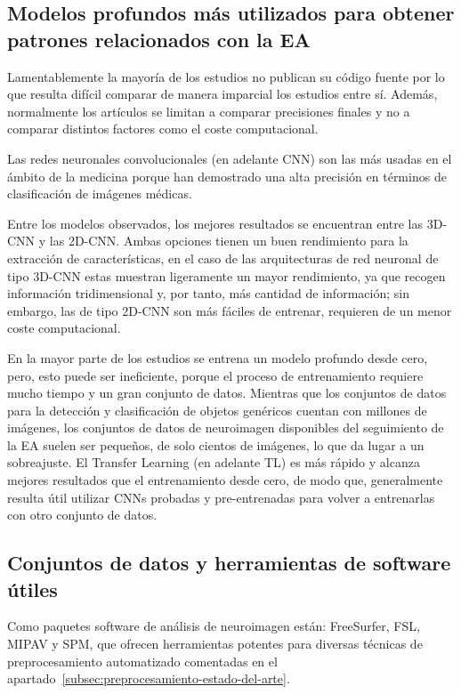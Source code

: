 \subsection{Modelos profundos más utilizados para obtener patrones relacionados con la EA}
\label{subsec:modelos-profundos-estado-del-arte}
Lamentablemente la mayoría de los estudios no publican su código fuente por lo que resulta difícil comparar de manera
imparcial los estudios entre sí.
Además, normalmente los artículos se limitan a comparar precisiones finales y no a comparar distintos factores como el
coste computacional.

Las redes neuronales convolucionales (en adelante CNN) son las más usadas en el ámbito de la medicina porque han
demostrado una alta precisión en términos de clasificación de imágenes médicas.

Entre los modelos observados, los mejores resultados se encuentran entre las 3D-CNN y las 2D-CNN. Ambas opciones tienen
un buen rendimiento para la extracción de características, en el caso de las arquitecturas de red neuronal de tipo
3D-CNN estas muestran ligeramente un mayor rendimiento, ya que recogen información tridimensional y, por tanto, más
cantidad de información;
sin embargo, las de tipo 2D-CNN son más fáciles de entrenar, requieren de un menor coste computacional.

En la mayor parte de los estudios se entrena un modelo profundo desde cero, pero, esto puede ser ineficiente, porque
el proceso de entrenamiento requiere mucho tiempo y un gran conjunto de datos.
Mientras que los conjuntos de datos para la detección y clasificación de objetos genéricos cuentan con millones de
imágenes, los conjuntos de datos de neuroimagen disponibles del seguimiento de la EA suelen ser pequeños, de solo
cientos de imágenes, lo que da lugar a un sobreajuste.
El Transfer Learning (en adelante TL) es más rápido y alcanza mejores resultados que el entrenamiento desde cero, de
modo que, generalmente resulta útil utilizar CNNs probadas y pre-entrenadas para volver a entrenarlas con otro conjunto
de datos.

\subsection{Conjuntos de datos y herramientas de software útiles}\label{subsec:datos-y-herramientas-estado-del-arte}
Como paquetes software de análisis de neuroimagen están: FreeSurfer, FSL, MIPAV y SPM, que ofrecen herramientas potentes
para diversas técnicas de preprocesamiento automatizado comentadas en el
apartado~\ref{subsec:preprocesamiento-estado-del-arte}.

